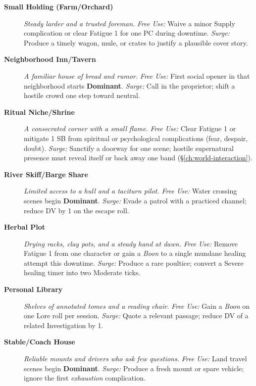 \begin{description}
  \item[\textbf{Small Holding (Farm/Orchard)}]  \emph{Steady larder and a trusted foreman.} \emph{Free Use:} Waive a minor Supply complication or clear Fatigue 1 for one PC during downtime. \emph{Surge:} Produce a timely wagon, mule, or crates to justify a plausible cover story.

  \item[\textbf{Neighborhood Inn/Tavern}]  \emph{A familiar house of bread and rumor.} \emph{Free Use:} First social opener in that neighborhood starts \textbf{Dominant}. \emph{Surge:} Call in the proprietor; shift a hostile crowd one step toward neutral.

  \item[\textbf{Ritual Niche/Shrine}]  \emph{A consecrated corner with a small flame.} \emph{Free Use:} Clear Fatigue 1 or mitigate 1 SB from spiritual or psychological complications (fear, despair, doubt). \emph{Surge:} Sanctify a doorway for one scene; hostile supernatural presence must reveal itself or back away one band (\S\ref{ch:world-interaction}).

  \item[\textbf{River Skiff/Barge Share}]  \emph{Limited access to a hull and a taciturn pilot.} \emph{Free Use:} Water crossing scenes begin \textbf{Dominant}. \emph{Surge:} Evade a patrol with a practiced channel; reduce DV by 1 on the escape roll.

  \item[\textbf{Herbal Plot}]  \emph{Drying racks, clay pots, and a steady hand at dawn.} \emph{Free Use:} Remove Fatigue 1 from one character or gain a \emph{Boon} to a single mundane healing attempt this downtime. \emph{Surge:} Produce a rare poultice; convert a Severe healing timer into two Moderate ticks.

  \item[\textbf{Personal Library}]  \emph{Shelves of annotated tomes and a reading chair.} \emph{Free Use:} Gain a \emph{Boon} on one Lore roll per session. \emph{Surge:} Quote a relevant passage; reduce DV of a related Investigation by 1.

  \item[\textbf{Stable/Coach House}]  \emph{Reliable mounts and drivers who ask few questions.} \emph{Free Use:} Land travel scenes begin \textbf{Dominant}. \emph{Surge:} Produce a fresh mount or spare vehicle; ignore the first \emph{exhaustion} complication.


\end{description}
